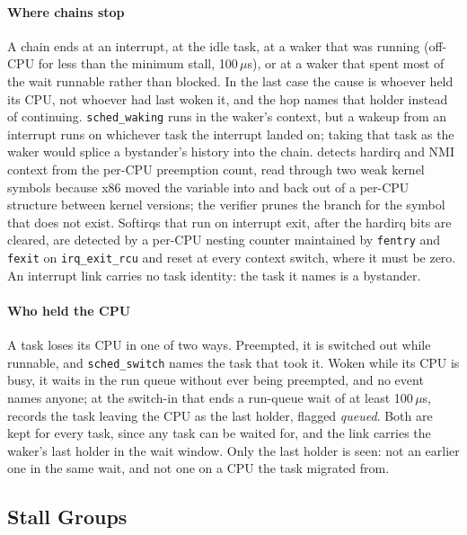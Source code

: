 \paragraph{Where chains stop} A chain ends at an interrupt, at the idle task, at
a waker that was running (off-CPU for less than the minimum stall,
100\,$\mu$s), or at a waker that spent most of the wait runnable rather than
blocked. In the last case the cause is whoever held its CPU, not whoever had
last woken it, and the hop names that holder instead of continuing.
\texttt{sched\_waking} runs in the waker's context, but a wakeup from an
interrupt runs on whichever task the interrupt landed on; taking that task
as the waker would splice a bystander's history into the chain. \sys
detects hardirq and NMI context from the
per-CPU preemption count, read through two weak kernel symbols because x86
moved the variable into and back out of a per-CPU structure between kernel
versions; the verifier prunes the branch for the symbol that does not exist.
Softirqs that run on interrupt exit, after the hardirq bits are cleared, are
detected by a per-CPU nesting counter maintained by \texttt{fentry} and
\texttt{fexit} on \texttt{irq\_exit\_rcu} and reset at every context switch,
where it must be zero. An interrupt link carries no task identity: the task
it names is a bystander.

\paragraph{Who held the CPU} A task loses its CPU in one of two ways. Preempted,
it is switched out while runnable, and \texttt{sched\_switch} names the task
that took it. Woken while its CPU is busy, it waits in the run queue without
ever being preempted, and no event names anyone; at the switch-in that ends
a run-queue wait of at least 100\,$\mu$s, \sys records the task leaving the
CPU as the last holder, flagged \emph{queued}. Both are kept for every task,
since any task can be waited for, and the link carries the waker's last
holder in the wait window. Only the last holder is seen: not an earlier one
in the same wait, and not one on a CPU the task migrated from.

\subsection{Stall Groups}
\label{sec:groups}

